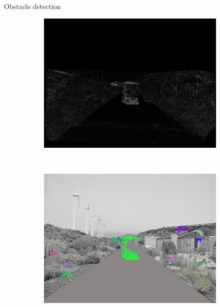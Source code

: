 \begin{frame}{Obstacle detection}
\begin{figure}[t]
\begin{subfigure}[b]{0.24\columnwidth}
	    \includegraphics[width=\textwidth]{pipeline2/fig4}\label{fig:pipelineB_3}
	\end{subfigure}%
	~
	\begin{subfigure}[b]{0.24\columnwidth}
	    \includegraphics[width=\textwidth]{pipeline2/fig5}\label{fig:pipelineB_4}
	\end{subfigure}%
  \end{figure}
\end{frame}

